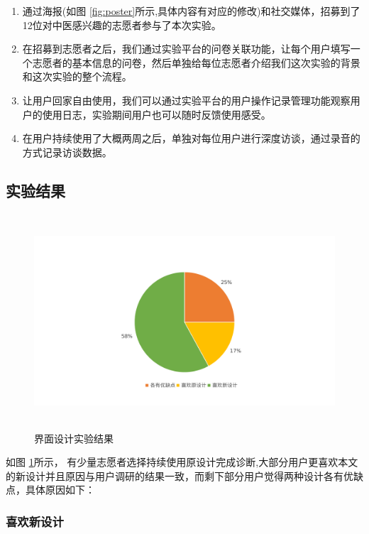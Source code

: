 \begin{enumerate}


    \item 通过海报(如图 \ref{fig:poster}所示,具体内容有对应的修改)和社交媒体，招募到了12位对中医感兴趣的志愿者参与了本次实验。

    \item 在招募到志愿者之后，我们通过实验平台的问卷关联功能，让每个用户填写一个志愿者的基本信息的问卷，然后单独给每位志愿者介绍我们这次实验的背景和这次实验的整个流程。

    \item  让用户回家自由使用，我们可以通过实验平台的用户操作记录管理功能观察用户的使用日志，实验期间用户也可以随时反馈使用感受。

    \item 在用户持续使用了大概两周之后，单独对每位用户进行深度访谈，通过录音的方式记录访谈数据。

\end{enumerate}

\subsection{实验结果}


\begin{figure}[ht]
    \centering
    \includegraphics[height=8cm]{images/ui-exp.pdf}
    \caption{界面设计实验结果}
    \label{fig:ui-exp}
\end{figure}

如图 \ref{fig:ui-exp}所示， 有少量志愿者选择持续使用原设计完成诊断,大部分用户更喜欢本文的新设计并且原因与用户调研的结果一致，而剩下部分用户觉得两种设计各有优缺点，具体原因如下：


\subsubsection{喜欢新设计}

